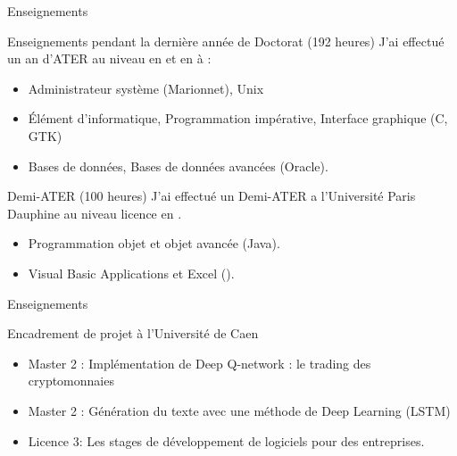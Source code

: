 \begin{frame}{Enseignements}

\begin{block}{Enseignements pendant la dernière année de Doctorat (192 heures)}
J’ai effectué un an d’ATER au niveau
 en  et en  à %
 :
\begin{itemize}
 \item Administrateur système (Marionnet), Unix
 \item Élément d'informatique, Programmation impérative, Interface graphique (C, GTK)
 \item Bases de données, Bases de données avancées (Oracle).
\end{itemize}
\end{block}
\begin{block}{Demi-ATER (100 heures)}
J’ai effectué un Demi-ATER a l’Université Paris Dauphine au niveau licence en . 
\begin{itemize} 
\item Programmation objet et objet avancée (Java).
\item Visual Basic Applications et Excel ().
\end{itemize}
%
\end{block}
\end{frame}

\begin{frame}{Enseignements} 
\begin{block}{Encadrement de projet à l'Université de Caen}
\begin{itemize}
 \item  Master 2 : Implémentation de Deep Q-network : le trading des cryptomonnaies
 \item Master 2 : Génération du texte avec une méthode de Deep Learning (LSTM)
 \item Licence 3: Les stages de développement de logiciels pour des entreprises.
\end{itemize}
\end{block}


\end{frame}


